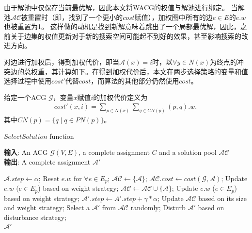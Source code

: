 由于解池中仅保存当前最优解，因此本文将WACG的权值与解池进行绑定。
当解池$\mathcal{AC}$被重置时（即，找到了一个更小的$cost$赋值），加权图中所有的边$e \in E$的$e.w$也被重置为1。
这样做的动机是找到新解意味着跳出了一个局部最优解，因此，之前关于边集的权值更新对于新的搜索空间可能起不到好的效果，甚至影响搜索的改进方向。

对边进行加权后，得到加权代价，即当$\mathcal{A}(x) = i$时，以$\forall y \in N(x)$为终点的冲突边的总权重，其计算如下。在得到加权代价后，本文在两步选择策略的变量和值选择过程中使用$cost'$代替$cost$，而算法的其他部分仍然使用$cost$。

\begin{definition}
给定一个ACG $\mathcal{G}$，变量$x$赋值$i$的加权代价定义为
\begin{align}
    cost'(x, i) =  \sum_{p \in N(x)} \sum_{q \in CN(p)} {(p, q).w},
\end{align}%
其中$CN(p) = \{q \mid q \in PN(p) \}$。
\end{definition}

\begin{algorithm}[t]
    \caption{$SelectSolution$ function}
    \label{alg:SelectSolution}
    \textbf{输入}: An ACG $\mathcal{G}(V,E)$, a complete assignment $C$ and a solution pool $\mathcal{AC}$\\
    \textbf{输出}: A complete assignment $\mathcal{A}'$
    
    \begin{algorithmic}[1] %
        \Statex \hrulefill
        \STATE $\mathcal{A}.step \leftarrow \alpha$;
            \STATE Reset $e.w$ for $\forall e \in E_p$;
            \STATE $\mathcal{AC} \leftarrow \{\mathcal{A}\}$;
            \STATE $\mathcal{AC}.cost \leftarrow cost(\mathcal{G},\mathcal{A})$;
            \STATE Update $e.w$ ($e \in E_p$) based on weight strategy;
                \STATE $\mathcal{AC} \leftarrow \mathcal{AC} \cup \{\mathcal{A}\}$;
                \STATE Update $e.w$ ($e \in E_p$) based on weight strategy;
            \ELSE
                \STATE $\mathcal{A}'.step \leftarrow A'.step + \gamma * \alpha$;
            \ENDIF
        \ENDIF
        \STATE Update $\mathcal{AC}$ based on its size and weight strategy;
        \STATE Select a $\mathcal{A}'$ from $\mathcal{AC}$ randomly;
        \STATE Disturb $\mathcal{A}'$ based on disturbance strategy;\\
        \RETURN $\mathcal{A}'$
    \end{algorithmic}
\end{algorithm}

